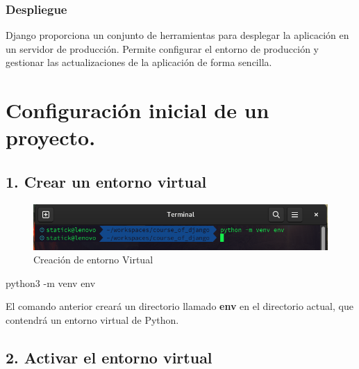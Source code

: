 \documentclass[
  a4paper,
  DIV=11,
  numbers=noendperiod,
  onepage,
  openany]{scrreprt}
\newenvironment{Shaded}{\begin{snugshade}}{\end{snugshade}}
\newcommand{\AttributeTok}[1]{\textcolor[rgb]{0.40,0.45,0.13}{#1}}
\newcommand{\ExtensionTok}[1]{\textcolor[rgb]{0.00,0.23,0.31}{#1}}
\newcommand{\NormalTok}[1]{\textcolor[rgb]{0.00,0.23,0.31}{#1}}
\begin{document}
\begin{tcolorbox}
\subsection{Despliegue}\label{despliegue}

Django proporciona un conjunto de herramientas para desplegar la
aplicación en un servidor de producción. Permite configurar el entorno
de producción y gestionar las actualizaciones de la aplicación de forma
sencilla.

\chapter{Configuración inicial de un
proyecto.}\label{configuraciuxf3n-inicial-de-un-proyecto.}

\section{1. Crear un entorno virtual}\label{crear-un-entorno-virtual-1}

\begin{figure}[H]

{\centering \includegraphics{images/creacion_entorno_virtual.png}

}

\caption{Creación de entorno Virtual}

\end{figure}%

\begin{Shaded}
\begin{Highlighting}[]
\ExtensionTok{python3} \AttributeTok{{-}m}\NormalTok{ venv env}
\end{Highlighting}
\end{Shaded}

El comando anterior creará un directorio llamado \textbf{env} en el
directorio actual, que contendrá un entorno virtual de Python.

\section{2. Activar el entorno
virtual}\label{activar-el-entorno-virtual}

\begin{figure}[H]


\end{figure}
\end{tcolorbox}
\end{document}
